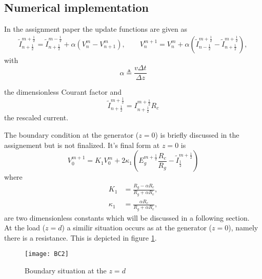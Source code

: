\subsection{Numerical implementation}

In the assignment paper the update functions are given as 
\begin{align}
    \tilde{I}^{m+\frac{1}{2}}_{n+\frac{1}{2}} = \tilde{I}^{m-\frac{1}{2}}_{n+\frac{1}{2}} + \alpha\left(V^{m}_{n} - V^{m}_{n+1}\right) \label{update}, \quad\quad
    V^{m+1}_n = V^{m}_{n} + \alpha\left(\tilde{I}^{m+\frac{1}{2}}_{n-\frac{1}{2}}-\tilde{I}^{m+\frac{1}{2}}_{n+\frac{1}{2}}\right),  
\end{align}
with
\begin{equation}
\alpha \triangleq \frac{v\Delta t}{\Delta z}
    \label{alpha}
\end{equation}

the dimensionless Courant factor and
\begin{equation}
    \tilde{I}^{m+\frac{1}{2}}_{n+\frac{1}{2}} = I^{m+\frac{1}{2}}_{n+\frac{1}{2}}R_c
    \label{Itil}
\end{equation}
the rescaled current.

The boundary condition at the generator ($z=0$) is briefly discussed in the assignement but is not finalized. It's final form at $z=0$ is
\begin{equation}
    V^{m+1}_{0} = K_{1}V^{m}_{0} + 2\kappa_{1}\left(E^{m+\frac{1}{2}}_{g}\frac{R_c}{R_{g}} - \tilde{I}^{m+\frac{1}{2}}_{\frac{1}{2}}\right)
\end{equation}
where
\begin{align}
    K_{1} & = \frac{R_{g}-\alpha R_{c}}{R_{g}+\alpha R_{c}},\\
    \kappa_{1} & = \frac{\alpha R_{c}}{R_{g}+\alpha R_{c}},
\end{align}
are two dimensionless constants which will be discussed in a following section.\\

At the load ($z=d$) a similir situation occurs as at the generator ($z=0$), namely there is a resistance. This is depicted in figure \ref{fig:Rl}.

\begin{figure}[h!]
    \centering
    \texttt{[image: BC2]}
    \caption{Boundary situation at the $z=d$}
    \label{fig:Rl}
\end{figure}

